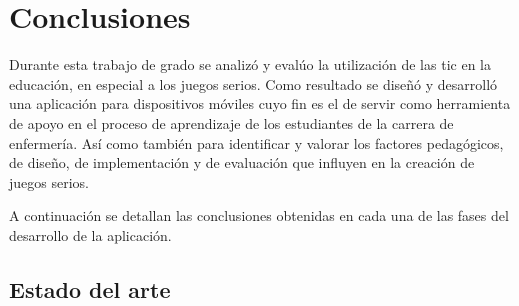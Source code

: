 \section{Conclusiones}

Durante esta trabajo de grado se analizó y evalúo la utilización de las
\Gls{tic} en la educación, en especial a los juegos serios. Como resultado se
diseñó y desarrolló una aplicación para dispositivos móviles cuyo fin es el de
servir como herramienta de apoyo en el proceso de aprendizaje de los estudiantes
de la carrera de enfermería. Así como también para identificar y valorar
los factores pedagógicos, de diseño, de implementación y de evaluación que
influyen en la creación de juegos serios.



A continuación se detallan las conclusiones obtenidas en cada una de las fases
del desarrollo de la aplicación.

\subsection{Estado del arte}

